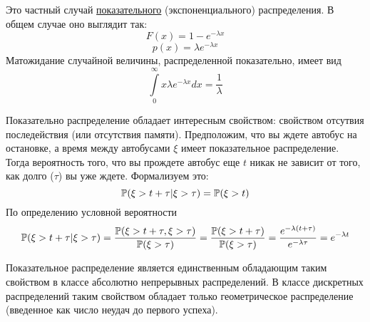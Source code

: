 \documentclass[../TV&MS.tex]{subfiles}
\begin{document}
Это частный случай \underline{показательного} (экспоненциального) распределения. В общем случае оно выглядит так:
$$F(x) = 1 - e^{-\lambda x}$$
$$p(x) = \lambda e^{-\lambda x}$$
Матожидание случайной величины, распределенной показательно, имеет вид
$$\int\limits_0^{\infty} x\lambda e^{-\lambda x}dx = \frac1{\lambda}$$

Показательно распределение обладает интересным свойством: свойством отсутвия последействия (или отсутствия памяти). Предположим, что вы ждете автобус на 
остановке, а время между автобусами $\xi$ имеет показательное распределение. Тогда вероятность того, что вы прождете автобус еще $t$ никак не зависит от того, 
как долго ($\tau$) вы уже ждете. Формализуем это:
$$ \mathbb{P}(\xi > t + \tau | \xi > \tau) = \mathbb{P}(\xi > t)$$
По определению условной вероятности
$$\mathbb{P}(\xi > t + \tau | \xi > \tau) = \frac{\mathbb{P}(\xi > t + \tau, \xi > \tau)}{\mathbb{P}(\xi > \tau)} = \frac{\mathbb{P}(\xi > t + \tau)}{\mathbb{P}(\xi > \tau)} = \frac{e^{-\lambda(t+\tau)}}{e^{-\lambda \tau}} = e^{-\lambda t}$$

Показательное распределение является единственным обладающим таким свойством в классе абсолютно непрерывных распределений. В классе дискретных распределений таким свойством обладает только геометрическое распределение (введенное как число неудач до первого успеха).

\newpage
\end{document}
